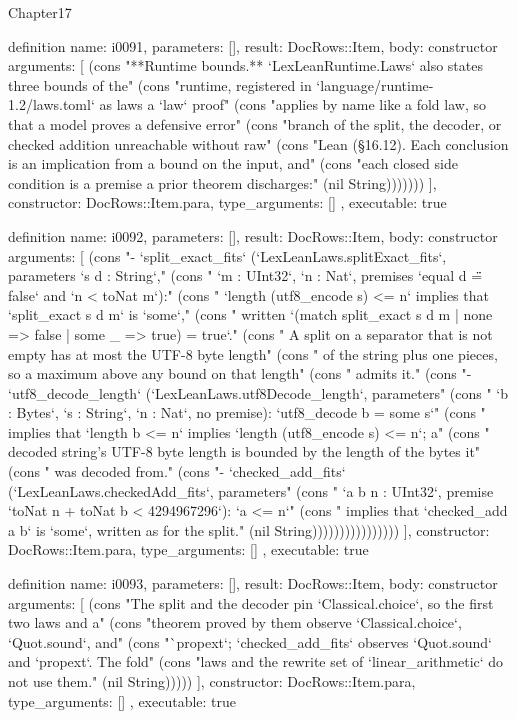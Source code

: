 \begin{lexlean}{Chapter17}
\begin{semanticmodule}
definition{
  name: i0091,
  parameters: [],
  result: DocRows::Item,
  body: constructor{
    arguments: [
      (cons "**Runtime bounds.** `LexLeanRuntime.Laws` also states three bounds of the" (cons "runtime, registered in `language/runtime-1.2/laws.toml` as laws a `law` proof" (cons "applies by name like a fold law, so that a model proves a defensive error" (cons "branch of the split, the decoder, or checked addition unreachable without raw" (cons "Lean (§16.12). Each conclusion is an implication from a bound on the input, and" (cons "each closed side condition is a premise a prior theorem discharges:" (nil String)))))))
    ],
    constructor: DocRows::Item.para,
    type_arguments: []
  },
  executable: true
}

definition{
  name: i0092,
  parameters: [],
  result: DocRows::Item,
  body: constructor{
    arguments: [
      (cons "- `split_exact_fits` (`LexLeanLaws.splitExact_fits`, parameters `s d : String`," (cons "  `m : UInt32`, `n : Nat`, premises `equal d \"\" = false` and `n < toNat m`):" (cons "  `length (utf8_encode s) <= n` implies that `split_exact s d m` is `some`," (cons "  written `(match split_exact s d m | none => false | some _ => true) = true`." (cons "  A split on a separator that is not empty has at most the UTF-8 byte length" (cons "  of the string plus one pieces, so a maximum above any bound on that length" (cons "  admits it." (cons "- `utf8_decode_length` (`LexLeanLaws.utf8Decode_length`, parameters" (cons "  `b : Bytes`, `s : String`, `n : Nat`, no premise): `utf8_decode b = some s`" (cons "  implies that `length b <= n` implies `length (utf8_encode s) <= n`; a" (cons "  decoded string's UTF-8 byte length is bounded by the length of the bytes it" (cons "  was decoded from." (cons "- `checked_add_fits` (`LexLeanLaws.checkedAdd_fits`, parameters" (cons "  `a b n : UInt32`, premise `toNat n + toNat b < 4294967296`): `a <= n`" (cons "  implies that `checked_add a b` is `some`, written as for the split." (nil String))))))))))))))))
    ],
    constructor: DocRows::Item.para,
    type_arguments: []
  },
  executable: true
}

definition{
  name: i0093,
  parameters: [],
  result: DocRows::Item,
  body: constructor{
    arguments: [
      (cons "The split and the decoder pin `Classical.choice`, so the first two laws and a" (cons "theorem proved by them observe `Classical.choice`, `Quot.sound`, and" (cons "`propext`; `checked_add_fits` observes `Quot.sound` and `propext`. The fold" (cons "laws and the rewrite set of `linear_arithmetic` do not use them." (nil String)))))
    ],
    constructor: DocRows::Item.para,
    type_arguments: []
  },
  executable: true
}


\end{semanticmodule}
\end{lexlean}

